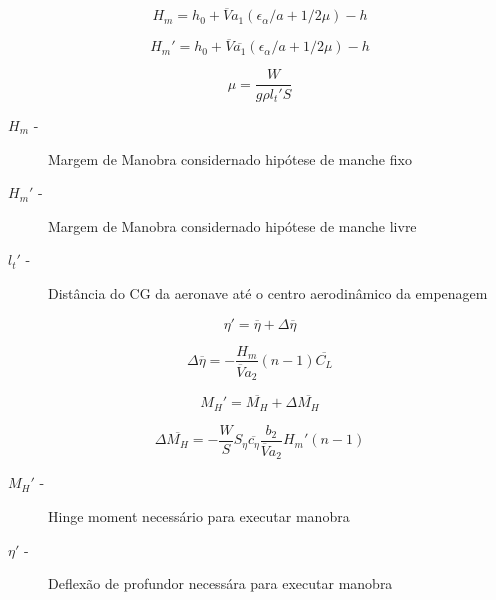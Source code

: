 \begin{equation}
\label{margemmanobra1}
H_m = h_0 + \overline{V} a_1 (\epsilon_{\alpha}/a + 1/2 \mu) - h
\end{equation}

\begin{equation}
\label{margemmanobra2}
H_m' = h_0 + \overline{V} \overline{a_1} (\epsilon_{\alpha}/a + 1/2 \mu) - h
\end{equation}

\begin{equation}
\label{margemmanobra3}
\mu = \frac{W}{g \rho l_t' S}
\end{equation}

\begin{description}
\item[$H_m$ -] Margem de Manobra considernado hipótese de manche fixo
\item[$H_m'$ -] Margem de Manobra considernado hipótese de manche livre
\item[$l_t'$ -] Distância do CG da aeronave até o centro aerodinâmico da empenagem
\end{description}

\begin{equation}
\label{vooNz_1}
\eta' = \overline{\eta} + \Delta\overline{\eta}
\end{equation}

\begin{equation}
\label{vooNz_2}
\Delta\overline{\eta} = - \frac{H_m}{\overline{V} a_2} (n - 1) \overline{C_L}
\end{equation}

\begin{equation}
\label{vooNz_3}
M_H' = \overline{M_H} + \Delta\overline{M_H}
\end{equation}

\begin{equation}
\label{vooNz_4}
\Delta\overline{M_H} = - \frac{W}{S} S_{\eta} \overline{c_{\eta}} \frac{b_2}{\overline{V} a_2} H_m' (n-1)
\end{equation}

\begin{description}
\item[$M_H'$ -] Hinge moment necessário para executar manobra
\item[$\eta'$ -] Deflexão de profundor necessára para executar manobra
\end{description}

